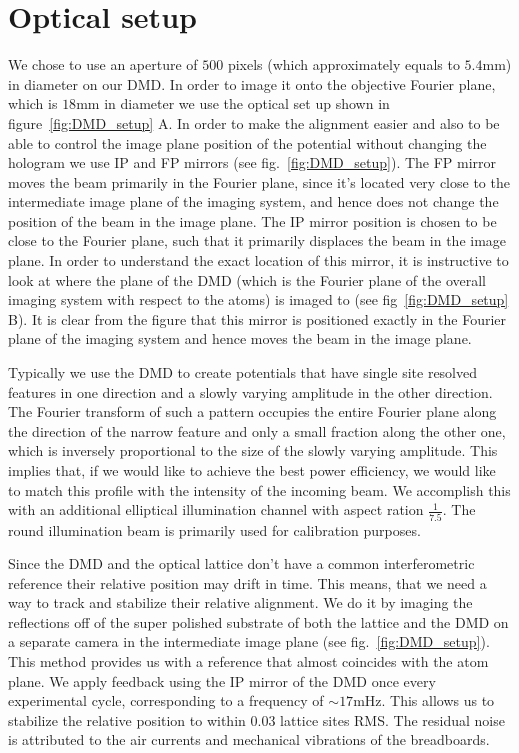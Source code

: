 \section{Optical setup}
We chose to use an aperture of $500$ pixels (which approximately equals to $5.4 \mathrm{mm}$) in diameter on our DMD. In order to image it onto the objective Fourier plane, which is $18 \mathrm{mm}$ in diameter we use the optical set up shown in figure~\ref{fig:DMD_setup} A. In order to make the alignment easier and also to be able to control the image plane position of the potential without changing the hologram we use IP and FP mirrors (see fig.~\ref{fig:DMD_setup}). The FP mirror moves the beam primarily in the Fourier plane, since it's located very close to the intermediate image plane of the imaging system, and hence does not change the position of the beam in the image plane. The IP mirror position is chosen to be close to the Fourier plane, such that it primarily displaces the beam in the image plane. In order to understand the exact location of this mirror, it is instructive to look at where the plane of the DMD (which is the Fourier plane of the overall imaging system with respect to the atoms) is imaged to (see fig~\ref{fig:DMD_setup} B). It is clear from the figure that this mirror is positioned exactly in the Fourier plane of the imaging system and hence moves the beam in the image plane.

Typically we use the DMD to create potentials that have single site resolved features in one direction and a slowly varying amplitude in the other direction. The Fourier transform of such a pattern occupies the entire Fourier plane along the direction of the narrow feature and only a small fraction along the other one, which is inversely proportional to the size of the slowly varying amplitude. This implies that, if we would like to achieve the best power efficiency, we would like to match this profile with the intensity of the incoming beam. We accomplish this with an additional elliptical illumination channel with aspect ration $\frac{1}{7.5}$. The round illumination beam is primarily used for calibration purposes.

Since the DMD and the optical lattice don't have a common interferometric reference their relative position may drift in time. This means, that we need a way to track and stabilize their relative alignment. We do it by imaging the reflections off of the super polished substrate of both the lattice and the DMD on a separate camera in the intermediate image plane (see fig.~\ref{fig:DMD_setup}). This method provides us with a reference that almost coincides with the atom plane. We apply feedback using the IP mirror of the DMD once every experimental cycle, corresponding to a frequency of $\sim 17 \mathrm{mHz}$. This allows us to stabilize the relative position to within $0.03$ lattice sites RMS. The residual noise is attributed to the air currents and mechanical vibrations of the breadboards.

